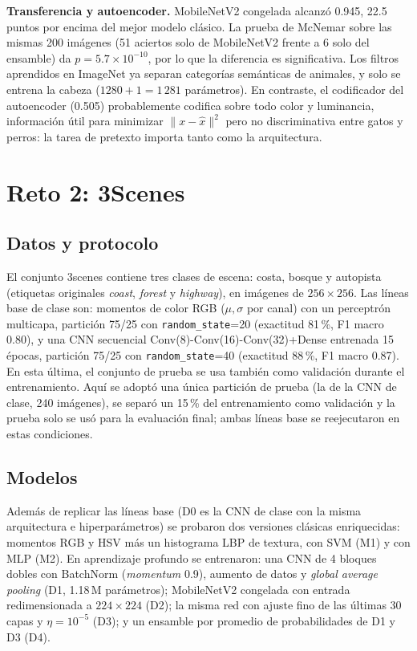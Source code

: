 \documentclass[conference]{IEEEtran}
\begin{document}
\textbf{Transferencia y autoencoder.} MobileNetV2 congelada alcanzó 0.945, 22.5 puntos por encima del mejor modelo clásico. La prueba de McNemar sobre las mismas 200 imágenes (51 aciertos solo de MobileNetV2 frente a 6 solo del ensamble) da $p=5.7\times10^{-10}$, por lo que la diferencia es significativa. Los filtros aprendidos en ImageNet ya separan categorías semánticas de animales, y solo se entrena la cabeza ($1280+1=1\,281$ parámetros). En contraste, el codificador del autoencoder (0.505) probablemente codifica sobre todo color y luminancia, información útil para minimizar $\|x-\hat x\|^2$ pero no discriminativa entre gatos y perros: la tarea de pretexto importa tanto como la arquitectura.

\section{Reto 2: 3Scenes}
\subsection{Datos y protocolo}
El conjunto 3scenes contiene tres clases de escena: costa, bosque y autopista (etiquetas originales \emph{coast}, \emph{forest} y \emph{highway}), en imágenes de $256\times256$. Las líneas base de clase son: momentos de color RGB ($\mu,\sigma$ por canal) con un perceptrón multicapa, partición 75/25 con \texttt{random\_state}=20 (exactitud 81\,\%, F1 macro 0.80), y una CNN secuencial Conv(8)-Conv(16)-Conv(32)+Dense entrenada 15 épocas, partición 75/25 con \texttt{random\_state}=40 (exactitud 88\,\%, F1 macro 0.87). En esta última, el conjunto de prueba se usa también como validación durante el entrenamiento. Aquí se adoptó una única partición de prueba (la de la CNN de clase, 240 imágenes), se separó un 15\,\% del entrenamiento como validación y la prueba solo se usó para la evaluación final; ambas líneas base se reejecutaron en estas condiciones.

\subsection{Modelos}
Además de replicar las líneas base (D0 es la CNN de clase con la misma arquitectura e hiperparámetros) se probaron dos versiones clásicas enriquecidas: momentos RGB y HSV más un histograma LBP de textura, con SVM (M1) y con MLP (M2). En aprendizaje profundo se entrenaron: una CNN de 4 bloques dobles con BatchNorm (\emph{momentum} 0.9), aumento de datos y \emph{global average pooling} (D1, 1.18\,M parámetros); MobileNetV2 congelada con entrada redimensionada a $224\times224$ (D2); la misma red con ajuste fino de las últimas 30 capas y $\eta=10^{-5}$ (D3); y un ensamble por promedio de probabilidades de D1 y D3 (D4).
\end{document}
